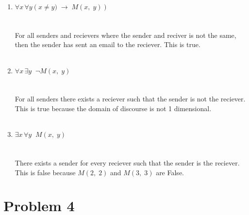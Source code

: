 \documentclass{amsart}
\theoremstyle{definition}
\theoremstyle{Exercise}
\theoremstyle{remark}
\theoremstyle{rule}
\numberwithin{equation}{section}
\begin{document}
\begin{enumerate}[label=(\alph*)]

\item $\forall x \, \forall y \left(x\not= y)\;\to \;  M(x,\;y)\right)$\\\\
\\
For all senders and recievers where the sender and reciver is not the same, then the sender has sent an email to the reciever.
This is true.
\\\\
\item $\forall x \, \exists y \;\; \neg M(x,\;y)$\\\\
\\
For all senders there exists a reciever such that the sender is not the reciever.
This is true because the domain of discourse is not 1 dimensional.
\\\\
\item $\exists x \, \forall y \;\; M(x,\;y)$\\\\
\\
There exists a sender for every reciever such that the sender is the reciever.
This is false because $M(2,\; 2)$ and $M(3,\; 3)$ are False.
\end{enumerate}

\newpage


\section*{Problem 4}
\end{document}
